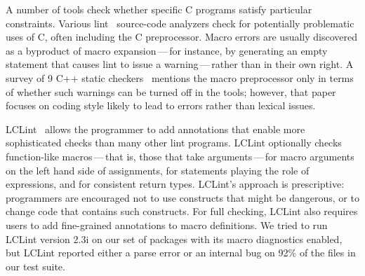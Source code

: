 \documentclass[10pt]{article}
\begin{document}

A number of tools check whether specific C programs satisfy particular
constraints.  Various lint~\cite{Johnson77} source-code analyzers check for
potentially problematic uses of C, often including the C preprocessor.
Macro errors are usually discovered as a byproduct of macro
expansion\,---\,for instance, by generating an empty statement that causes
lint to issue a warning\,---\,rather than in their own right.  A survey of
9 C++ static checkers~\cite{MeyersK97} mentions the macro preprocessor only
in terms of whether such warnings can be turned off in the tools; however,
that paper focuses on coding style likely to lead to errors rather than
lexical issues.



LCLint~\cite{Evans-fse94,Evans:LCLint} allows the programmer to add
annotations that enable more sophisticated checks than many other lint
programs.  LCLint optionally checks function-like macros\,---\,that is,
those that take arguments\,---\,for macro arguments on the left hand side
of assignments, for statements playing the role of expressions, and for
consistent return types.  LCLint's approach is prescriptive:  programmers
are encouraged not to use constructs that might be dangerous, or to change
code that contains such constructs.  For full checking, LCLint also
requires users to add fine-grained annotations to macro definitions.  We
tried to run LCLint version 2.3i on our set of packages with its macro diagnostics
enabled, but LCLint reported either a parse error or an internal bug on
92\% of the files in our test suite.
\end{document}
